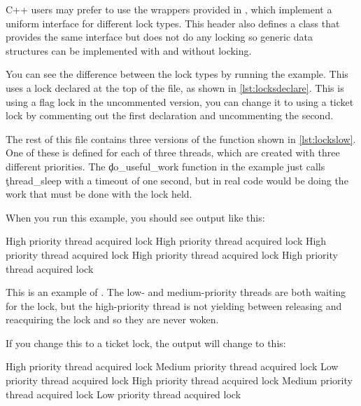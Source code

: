 C++ users may prefer to use the wrappers provided in , which implement a uniform interface for different lock types.
This header also defines a  class that provides the same interface but does not do any locking so generic data structures can be implemented with and without locking.

You can see the difference between the lock types by running the  example.
This uses a lock declared at the top of the file, as shown in \ref{lst:locksdeclare}.
This is using a flag lock in the uncommented version, you can change it to using a ticket lock by commenting out the first declaration and uncommenting the second.

\codelisting[filename=examples/locking/locking.cc,marker=declare,label=lst:locksdeclare,caption="Declaring a lock in C++"]{}

The rest of this file contains three versions of the function shown in \ref{lst:lockslow}.
One of these is defined for each of three threads, which are created with three different priorities.
The \c{do_useful_work} function in the example just calls \c{thread_sleep} with a timeout of one second, but in real code would be doing the work that must be done with the lock held.

\codelisting[filename=examples/locking/locking.cc,marker=low,label=lst:lockslow,caption="The low-priority thread entry point for the locking example"]{}

When you run this example, you should see output like this:

\begin{console}
High priority thread acquired lock
High priority thread acquired lock
High priority thread acquired lock
High priority thread acquired lock
High priority thread acquired lock
\end{console}

This is an example of .
The low- and medium-priority threads are both waiting for the lock, but the high-priority thread is not yielding between releasing and reacquiring the lock and so they are never woken.

If you change this to a ticket lock, the output will change to this:

\begin{console}
High priority thread acquired lock
Medium priority thread acquired lock
Low priority thread acquired lock
High priority thread acquired lock
Medium priority thread acquired lock
Low priority thread acquired lock
\end{console}

